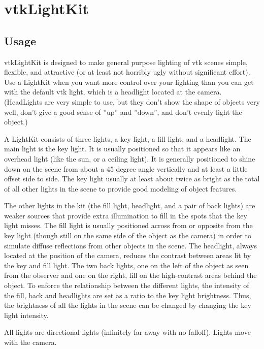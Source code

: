 \section{vtkLightKit}

\subsection{Usage}

 vtkLightKit is designed to make general purpose lighting of vtk
 scenes simple, flexible, and attractive (or at least not horribly
 ugly without significant effort).  Use a LightKit when you want
 more control over your lighting than you can get with the default
 vtk light, which is a headlight located at the camera. (HeadLights
 are very simple to use, but they don't show the shape of objects very 
 well, don't give a good sense of ''up'' and ''down'', and don't evenly
 light the object.)

 A LightKit consists of three lights, a key light, a fill light, and
 a headlight.  The main light is the key light.  It is usually
 positioned so that it appears like an overhead light (like the sun,
 or a ceiling light).  It is generally positioned to shine down on the
 scene from about a 45 degree angle vertically and at least a little
 offset side to side.  The key light usually at least about twice as 
 bright as the total of all other lights in the scene to provide good
 modeling of object features.
 
 The other lights in the kit (the fill light, headlight, and a pair of
 back lights) are weaker sources that provide extra
 illumination to fill in the spots that the key light misses.  The
 fill light is usually positioned across from or opposite from the
 key light (though still on the same side of the object as the
 camera) in order to simulate diffuse reflections from other objects
 in the scene.  The headlight, always located at the position of the
 camera, reduces the contrast between areas lit by the key and fill
 light. The two back lights, one on the left of the object as seen
 from the observer and one on the right, fill on the high-contrast
 areas behind the object.  To enforce the relationship between the
 different lights, the intensity of the fill, back and headlights
 are set as a ratio to the key light brightness.  Thus, the
 brightness of all the lights in the scene can be changed by
 changing the key light intensity.

 All lights are directional lights (infinitely far away with no
 falloff).  Lights move with the camera.

